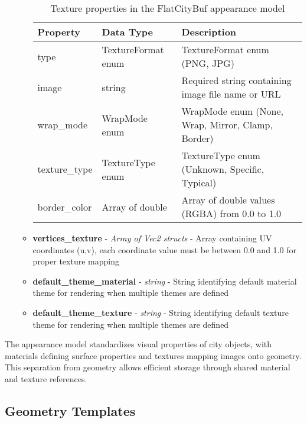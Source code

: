 \begin{itemize}
\begin{itemize}
        \begin{table}[h]
          \centering
          \caption{Texture properties in the FlatCityBuf appearance model}
          \label{tab:texture_properties}
          \begin{tabular}{@{}lll@{}}
            \toprule
            \textbf{Property} & \textbf{Data Type} & \textbf{Description} \\
            \midrule
            type & TextureFormat enum & TextureFormat enum (PNG, JPG) \\
            image & string & Required string containing image file name or URL \\
            wrap\_mode & WrapMode enum & WrapMode enum (None, Wrap, Mirror, Clamp, Border) \\
            texture\_type & TextureType enum & TextureType enum (Unknown, Specific, Typical) \\
            border\_color & Array of double & Array of double values (RGBA) from 0.0 to 1.0 \\
            \bottomrule
          \end{tabular}
        \end{table}

      \item \textbf{vertices\_texture} - \textit{Array of Vec2 structs} - Array containing UV coordinates (u,v), each coordinate value must be between 0.0 and 1.0 for proper texture mapping

      \item \textbf{default\_theme\_material} - \textit{string} - String identifying default material theme for rendering when multiple themes are defined
      \item \textbf{default\_theme\_texture} - \textit{string} - String identifying default texture theme for rendering when multiple themes are defined
    \end{itemize}
\end{itemize}

The appearance model standardizes visual properties of city objects, with materials defining surface properties and textures mapping images onto geometry. This separation from geometry allows efficient storage through shared material and texture references.

\subsection{Geometry Templates}
\label{methodology:header:geometry_templates}


